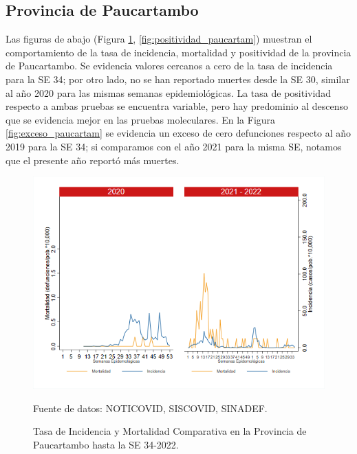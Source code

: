 \documentclass[12pt,a4paper,openany]{book}
\begin{document}
	\subsection*{Provincia de Paucartambo}
	\noindent Las figuras de abajo (Figura \ref{fig:inc_mort_paucartam}, \ref{fig:positividad_paucartam}) muestran el comportamiento de la tasa de incidencia, mortalidad y positividad de la provincia de Paucartambo. Se evidencia valores cercanos a cero de la tasa de incidencia para la SE 34; por otro lado, no se han reportado muertes desde la SE 30, similar al año 2020 para las mismas semanas epidemiológicas. La tasa de positividad respecto a ambas pruebas se encuentra variable, pero hay predominio al descenso que se evidencia mejor en las pruebas moleculares. 
	En la Figura \ref{fig:exceso_paucartam} se evidencia un exceso de cero defunciones respecto al año 2019 para la SE 34; si comparamos con el año 2021 para la misma SE, notamos que el presente año reportó más muertes.
	\begin{figure}[h]
		\caption{Tasa de Incidencia y Mortalidad Comparativa en la Provincia de Paucartambo hasta la SE 34-2022.}\label{fig:inc_mort_paucartam}
		\begin{center}
			\includegraphics[width=0.85\linewidth]{../figuras/incidencia_mortalidad_20_21_11.png}
		\end{center}
		{\footnotesize {Fuente de datos: NOTICOVID, SISCOVID, SINADEF.}}
	\end{figure}
	
\end{document}
